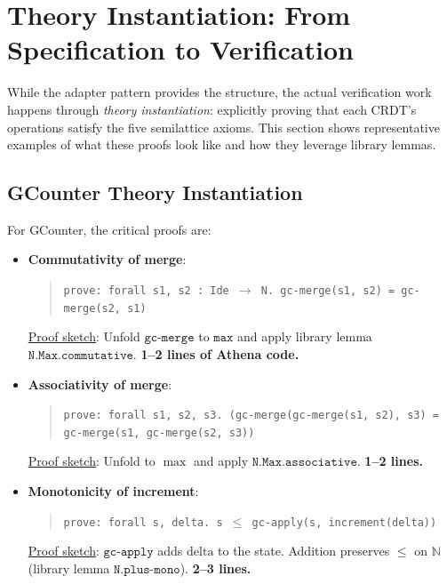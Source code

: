 \section{Theory Instantiation: From Specification to Verification}

\label{sec:theory-instantiation}

While the adapter pattern provides the structure, the actual verification work happens through \emph{theory instantiation}: explicitly proving that each CRDT's operations satisfy the five semilattice axioms. This section shows representative examples of what these proofs look like and how they leverage library lemmas.

\subsection{GCounter Theory Instantiation}

For GCounter, the critical proofs are:

\begin{itemize}
  \item \textbf{Commutativity of merge}:
    \begin{quote}
      \small \texttt{prove: forall s1, s2 : Ide $\to$ N. gc-merge(s1, s2) = gc-merge(s2, s1)}
    \end{quote}
    \underline{Proof sketch}: Unfold $\texttt{gc-merge}$ to $\texttt{max}$ and apply library lemma $\texttt{N.Max.commutative}$. \textbf{1--2 lines of Athena code.}

  \item \textbf{Associativity of merge}:
    \begin{quote}
      \small \texttt{prove: forall s1, s2, s3. (gc-merge(gc-merge(s1, s2), s3) = gc-merge(s1, gc-merge(s2, s3))}
    \end{quote}
    \underline{Proof sketch}: Unfold to $\max$ and apply $\texttt{N.Max.associative}$. \textbf{1--2 lines.}

  \item \textbf{Monotonicity of increment}:
    \begin{quote}
      \small \texttt{prove: forall s, delta. s $\leq$ gc-apply(s, increment(delta))}
    \end{quote}
    \underline{Proof sketch}: $\texttt{gc-apply}$ adds $\text{delta}$ to the state. Addition preserves $\leq$ on $\mathbb{N}$ (library lemma $\texttt{N.plus-mono}$). \textbf{2--3 lines.}
\end{itemize}

